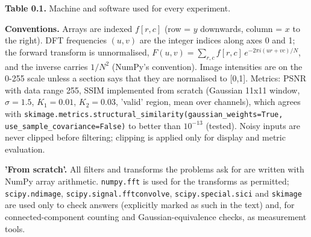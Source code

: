 \documentclass[10pt,a4paper]{article}
\begin{document}
\begin{table}[H]\centering\small{\small\textbf{Table 0.1.} Machine and software used for every experiment.\par}\vskip 3pt
\end{table}
\textbf{Conventions.} Arrays are indexed $f[r,c]$ (row = $y$ downwards, column = $x$ to the right). DFT frequencies $(u,v)$ are the integer indices along axes 0 and 1; the forward transform is unnormalised, $F(u,v)=\sum_{r,c} f[r,c]\,e^{-2\pi i (ur+vc)/N}$, and the inverse carries $1/N^2$ (NumPy's convention). Image intensities are on the 0-255 scale unless a section says that they are normalised to [0,1]. Metrics: PSNR with data range 255, SSIM implemented from scratch (Gaussian 11x11 window, $\sigma=1.5$, $K_1=0.01$, $K_2=0.03$, 'valid' region, mean over channels), which agrees with \texttt{skimage.\allowbreak{}metrics.\allowbreak{}structural\_\allowbreak{}similarity(\allowbreak{}gaussian\_\allowbreak{}weights=\allowbreak{}True,\allowbreak{} use\_\allowbreak{}sample\_\allowbreak{}covariance=\allowbreak{}False)} to better than $10^{-13}$ (tested). Noisy inputs are never clipped before filtering; clipping is applied only for display and metric evaluation.

\textbf{'From scratch'.} All filters and transforms the problems ask for are written with NumPy array arithmetic. \texttt{numpy.\allowbreak{}fft} is used for the transforms as permitted; \texttt{scipy.\allowbreak{}ndimage}, \texttt{scipy.\allowbreak{}signal.\allowbreak{}fftconvolve}, \texttt{scipy.\allowbreak{}special.\allowbreak{}sici} and \texttt{skimage} are used only to check answers (explicitly marked as such in the text) and, for connected-component counting and Gaussian-equivalence checks, as measurement tools.
\end{document}
